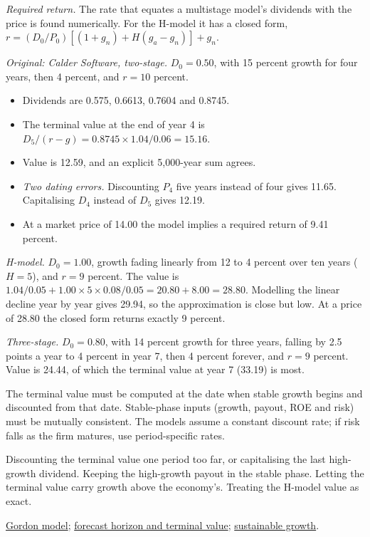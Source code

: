 \begin{qfmethod}
\emph{Required return.} The rate that equates a multistage model's dividends with the price is found numerically. For the H-model it has a closed form, $r=(D_0/P_0)[(1+g_n)+H(g_a-g_n)]+g_n$.

 \emph{Original: Calder Software, two-stage.} $D_0=0.50$, with 15 percent growth for four years, then 4 percent, and $r=10$ percent.
\begin{itemize}
\item Dividends are 0.575, 0.6613, 0.7604 and 0.8745.
\item The terminal value at the end of year 4 is $D_5/(r-g)=0.8745\times1.04/0.06=15.16$.
\item Value is 12.59, and an explicit 5,000-year sum agrees.
\item \emph{Two dating errors.} Discounting $P_4$ five years instead of four gives 11.65. Capitalising $D_4$ instead of $D_5$ gives 12.19.
\item At a market price of 14.00 the model implies a required return of 9.41 percent.
\end{itemize}

\emph{H-model.} $D_0=1.00$, growth fading linearly from 12 to 4 percent over ten years ($H=5$), and $r=9$ percent. The value is $1.04/0.05+1.00\times5\times0.08/0.05=20.80+8.00=28.80$. Modelling the linear decline year by year gives 29.94, so the approximation is close but low. At a price of 28.80 the closed form returns exactly 9 percent.

\emph{Three-stage.} $D_0=0.80$, with 14 percent growth for three years, falling by 2.5 points a year to 4 percent in year 7, then 4 percent forever, and $r=9$ percent. Value is 24.44, of which the terminal value at year 7 (33.19) is most.

 The terminal value must be computed at the date when stable growth begins and discounted from that date. Stable-phase inputs (growth, payout, ROE and risk) must be mutually consistent. The models assume a constant discount rate; if risk falls as the firm matures, use period-specific rates.

 Discounting the terminal value one period too far, or capitalising the last high-growth dividend. Keeping the high-growth payout in the stable phase. Letting the terminal value carry growth above the economy's. Treating the H-model value as exact.

 \hyperref[meth:gordon-growth-model]{Gordon model}; \hyperref[meth:forecast-horizon-steady-state]{forecast horizon and terminal value}; \hyperref[meth:sustainable-growth]{sustainable growth}.

\end{qfmethod}

